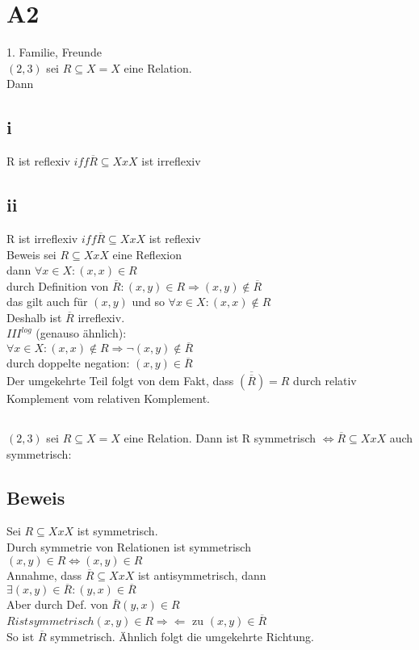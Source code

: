 \documentclass[11pt]{scrartcl}
\begin{document}
\section{A2}
1. Familie, Freunde \\
$(2,3)$ sei $R \subseteq X = X$ eine Relation. \\
Dann
\subsection*{i}
R ist reflexiv $iff \overline{R} \subseteq XxX$ ist irreflexiv \\
\subsection*{ii}
R ist irreflexiv $iff \overline{R} \subseteq XxX$ ist reflexiv \\

Beweis sei $R \subseteq XxX$ eine Reflexion \\
dann $\forall x \in X : (x,x) \in R$ \\
durch Definition von $\overline{R} : (x,y) \in R \Rightarrow (x,y) \notin \overline{R}$ \\
das gilt auch für $(x,y)$ und so $\forall x \in X : (x,x) \notin R$ \\
Deshalb ist $\overline{R}$ irreflexiv. \\

$III^{log}$ (genauso ähnlich):\\
$\forall x \in X : (x,x) \notin R \Rightarrow \neg (x,y) \notin \overline{R}$ \\
durch doppelte negation: $(x,y) \in \overline{R}$ \\
Der umgekehrte Teil folgt von dem Fakt, dass $\overline{(\overline{R})} = R$ durch relativ Komplement vom relativen Komplement. \\

\subsection*{}
$(2,3)$ sei $R \subseteq X = X$ eine Relation. Dann ist R symmetrisch $\iff \overline{R} \subseteq XxX$ auch symmetrisch: \\
\subsection{Beweis}
Sei $R \subseteq XxX$ ist symmetrisch. \\
Durch symmetrie von Relationen ist symmetrisch \\
$(x,y) \in R \iff (x,y) \in R$ \\
Annahme, dass $\overline{R} \subseteq XxX$ ist antisymmetrisch, dann \\ 
$\exists (x,y) \in \overline{R} : (y,x) \in \overline{R}$ \\
Aber durch Def. von $\overline{R} (y,x) \in R$ \\
$R ist symmetrisch (x,y) \in R \Rightarrow \Leftarrow$ zu $(x,y) \in \overline{R}$ \\
So ist $\overline{R}$ symmetrisch. Ähnlich folgt die umgekehrte Richtung.
\end{document}
